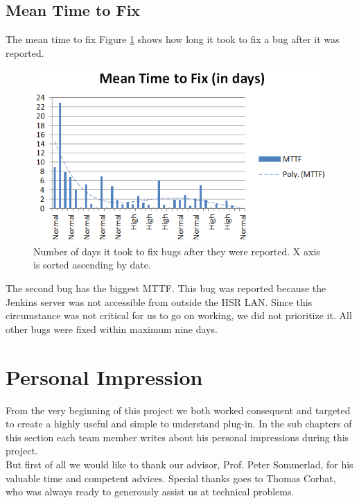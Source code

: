 \documentclass[11pt,a4paper,oneside]{scrreprt}
\begin{document}
\subsection{Mean Time to Fix}
The mean time to fix Figure \ref{fig:mttf} shows how long it took to fix a bug after it was reported.
\begin{figure}[h!tbp]
  \centering
\includegraphics[width=\textwidth]{figures/mttf.png}
\caption{Number of days it took to fix bugs after they were reported. X axis is sorted ascending by date.}
\label{fig:mttf}
\end{figure}

The second bug has the biggest MTTF. This bug was reported because the Jenkins server was not accessible from outside the HSR LAN. Since this circumstance was not critical for us to go on working, we did not prioritize it. All other bugs were fixed within maximum nine days.

\section{Personal Impression}
From the very beginning of this project we both worked consequent and targeted to create a highly useful and simple to understand plug-in. In the sub chapters of this section each team member writes about his personal impressions during this project.\\
But first of all we would like to thank our advisor, Prof. Peter Sommerlad, for his valuable time and competent advices. Special thanks goes to Thomas Corbat, who was always ready to generously assist us at technical problems.
\end{document}
